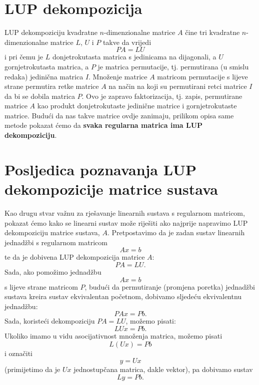 \documentclass[a4paper,12pt,oneside]{article}
\begin{document}
\section*{LUP dekompozicija}
LUP dekompoziciju kvadratne $n$-dimenzionalne matrice $A$ čine tri kvadratne $n$-dimenzionalne matrice $L$, $U$ i $P$ takve da vrijedi
$$PA = LU$$ 
i pri čemu je $L$ donjetrokutasta matrica s jedinicama na dijagonali, a $U$ gornjetrokutasta matrica, a $P$ je matrica permutacije, tj. permutirana (u smislu redaka) jedinična matrica $I$.
\newline\newline 
\noindent Množenje matrice $A$ matricom permutacije s lijeve strane permutira retke matrice $A$ na način na koji su permutirani retci matrice $I$ da bi se dobila matrica $P$. Ovo je zapravo faktorizacija, tj. zapis, permutirane matrice $A$ kao produkt donjetrokutaste jedinične matrice i gornjetrokutaste matrice.
\newline \newline
Budući da nas takve matrice ovdje zanimaju, prilikom opisa same metode pokazat ćemo da \textbf{svaka regularna matrica ima LUP dekompoziciju}.

\section*{Posljedica poznavanja LUP dekompozicije matrice sustava}
\noindent Kao drugu stvar važnu za rješavanje linearnih sustava s regularnom matricom, pokazat ćemo kako se linearni sustav može riješiti ako najprije napravimo LUP dekompoziciju matrice sustava, $A$.
\newline \newline
\noindent Pretpostavimo da je zadan sustav linearnih jednadžbi s regularnom matricom
$$Ax = b$$
te da je dobivena LUP dekompozicija matrice $A$:
$$PA = LU.$$
Sada, ako pomožimo jednadžbu
$$Ax = b$$
s lijeve strane matricom $P$, budući da permutiranje (promjena poretka) jednadžbi sustava kreira sustav ekvivalentan početnom, dobivamo sljedeću ekvivalentnu jednadžbu:
$$PAx = Pb.$$
Sada, koristeći dekompoziciju $PA = LU$, možemo pisati:
$$LUx = Pb.$$
Ukoliko imamo u vidu asocijativnost množenja matrica, možemo pisati
$$L(Ux) = Pb$$
i označiti
$$y = Ux$$
(primijetimo da je $Ux$ jednostupčana matrica, dakle vektor), pa dobivamo sustav
$$Ly = Pb.$$
\end{document}
